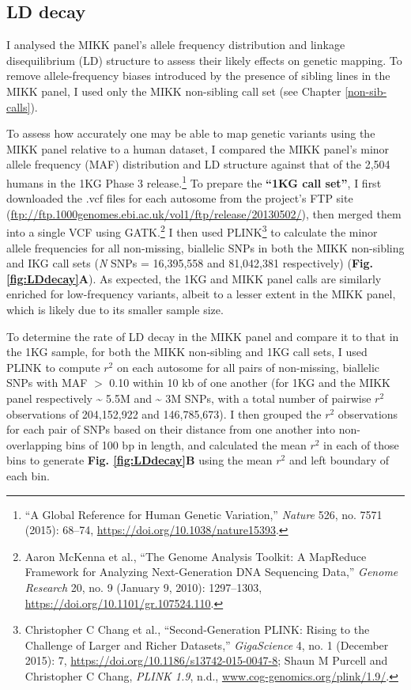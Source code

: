 \documentclass[
  9pt,
]{book}
\begin{document}
\hypertarget{ld-decay-sec}{%
\subsection{LD decay}\label{ld-decay-sec}}

I analysed the MIKK panel's allele frequency distribution and linkage disequilibrium (LD) structure to assess their likely effects on genetic mapping. To remove allele-frequency biases introduced by the presence of sibling lines in the MIKK panel, I used only the MIKK non-sibling call set (see Chapter \ref{non-sib-calls}).

To assess how accurately one may be able to map genetic variants using the MIKK panel relative to a human dataset, I compared the MIKK panel's minor allele frequency (MAF) distribution and LD structure against that of the 2,504 humans in the 1KG Phase 3 release.\footnote{{``A Global Reference for Human Genetic Variation,''} \emph{Nature} 526, no. 7571 (2015): 68--74, \url{https://doi.org/10.1038/nature15393}.} To prepare the \textbf{``1KG call set''}, I first downloaded the .vcf files for each autosome from the project's FTP site (\url{ftp://ftp.1000genomes.ebi.ac.uk/vol1/ftp/release/20130502/}), then merged them into a single VCF using GATK.\footnote{Aaron McKenna et al., {``The {Genome Analysis Toolkit}: {A MapReduce} Framework for Analyzing Next-Generation {DNA} Sequencing Data,''} \emph{Genome Research} 20, no. 9 (January 9, 2010): 1297--1303, \url{https://doi.org/10.1101/gr.107524.110}.} I then used PLINK\footnote{Christopher C Chang et al., {``Second-Generation {PLINK}: Rising to the Challenge of Larger and Richer Datasets,''} \emph{GigaScience} 4, no. 1 (December 2015): 7, \url{https://doi.org/10.1186/s13742-015-0047-8}; Shaun M Purcell and Christopher C Chang, \emph{{PLINK} 1.9}, n.d., \href{https://www.cog-genomics.org/plink/1.9/}{www.cog-genomics.org/plink/1.9/}.} to calculate the minor allele frequencies for all non-missing, biallelic SNPs in both the MIKK non-sibling and IKG call sets (\emph{N} SNPs = 16,395,558 and 81,042,381 respectively) (\textbf{Fig. \ref{fig:LDdecay}A}). As expected, the 1KG and MIKK panel calls are similarly enriched for low-frequency variants, albeit to a lesser extent in the MIKK panel, which is likely due to its smaller sample size.

To determine the rate of LD decay in the MIKK panel and compare it to that in the 1KG sample, for both the MIKK non-sibling and 1KG call sets, I used PLINK to compute \(r^2\) on each autosome for all pairs of non-missing, biallelic SNPs with MAF \(>\) 0.10 within 10 kb of one another (for 1KG and the MIKK panel respectively \textasciitilde{} 5.5M and \textasciitilde{} 3M SNPs, with a total number of pairwise \(r^2\) observations of 204,152,922 and 146,785,673). I then grouped the \(r^2\) observations for each pair of SNPs based on their distance from one another into non-overlapping bins of 100 bp in length, and calculated the mean \(r^2\) in each of those bins to generate \textbf{Fig. \ref{fig:LDdecay}B} using the mean \(r^2\) and left boundary of each bin.
\end{document}
